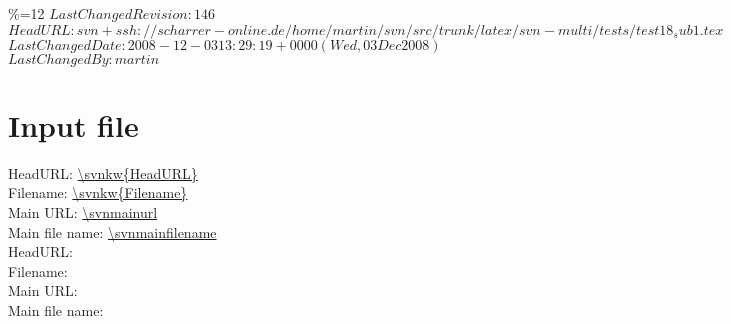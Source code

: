 \begingroup
\catcode\%=12
\svnidlong
{$LastChangedRevision: 146 $}
{$HeadURL: svn+ssh://scharrer-online.de/home/martin/svn/src/trunk/latex/svn-multi/tests/test18_sub1.tex $}
{$LastChangedDate: 2008-12-03 13:29:19 +0000 (Wed, 03 Dec 2008) $}
{$LastChangedBy: martin $}
\endgroup


\section{Input file}

\noindent
HeadURL: \url{\svnkw{HeadURL}} \\
Filename: \url{\svnkw{Filename}} \\
Main URL: \url{\svnmainurl} \\
Main file name: \url{\svnmainfilename} \\

\noindent
HeadURL:  \\
Filename:  \\
Main URL: \svnnolinkurl{\svnmainurl} \\
Main file name: \svnnolinkurl{\svnmainfilename} \\

